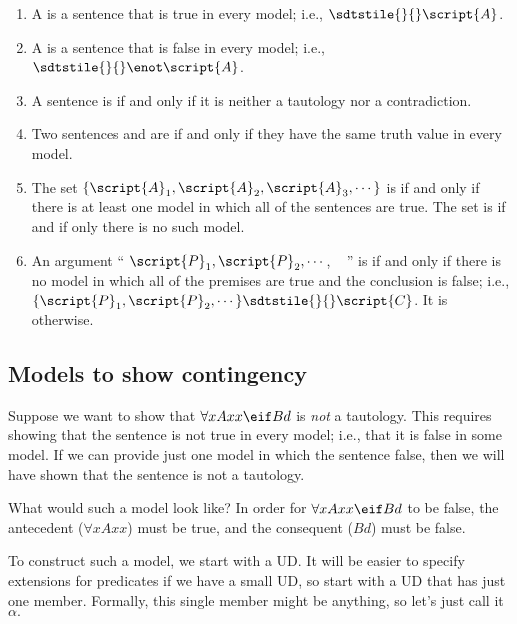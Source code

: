 \begin{enumerate}
\item A  is a sentence  that is true in every model; i.e.,  $\sdtstile{}{} \script{A}$.

\item A  is a sentence  that is false in every model; i.e., $\sdtstile{}{} \enot\script{A}$.

\item A sentence is  if and only if it is neither a tautology nor a contradiction.

\item Two sentences  and  are  if and only if they have the same truth value in every model.

\item The set $\{\script{A}_1,\script{A}_2,\script{A}_3,\cdots\}$ is  if and only if there is at least one model in which all of the sentences are true. The set is  if and if only there is no such model.

\item An argument `` $\script{P}_1, \script{P}_2, \cdots$, \therefore\  '' is  if and only if there is no model in which all of the premises are true and the conclusion is false; i.e., $\{\script{P}_1,\script{P}_2,\cdots\}\sdtstile{}{}\script{C}$. It is  otherwise.
\end{enumerate}


\subsection{Models to show contingency}

Suppose we want to show that $\forall xAxx \eif Bd$ is \emph{not} a tautology. This requires showing that the sentence is not true in every model; i.e., that it is false in some model. If we can provide just one model in which the sentence false, then we will have shown that the sentence is not a tautology.

What would such a model look like? In order for $\forall xAxx \eif Bd$ to be false, the antecedent ($\forall x Axx$) must be true, and the consequent ($Bd$) must be false.

To construct such a model, we start with a UD. It will be easier to specify extensions for predicates if we have a small UD, so start with a UD that has just one member. Formally, this single member might be anything, so let's just call it $\alpha.$ 

